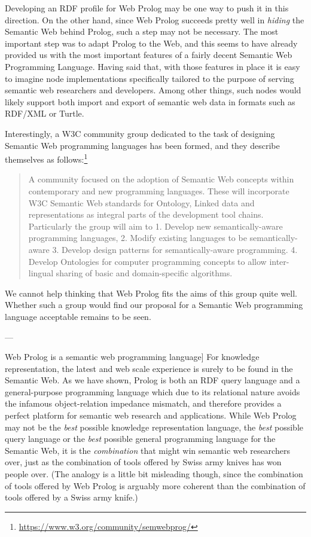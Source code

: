 \documentclass{tlp}
\begin{document}
Developing an RDF profile for Web Prolog may be one way to push it in this direction. On the other hand, since Web Prolog succeeds pretty well in \textit{hiding} the Semantic Web behind Prolog, such a step may not be necessary. The most important step was to adapt Prolog to the Web, and this seems to have already provided us with the most important features of a fairly decent Semantic Web Programming Language. Having said that, with those features in place it is easy to imagine node implementations specifically tailored to the purpose of serving semantic web researchers and developers. Among other things, such nodes would likely support both import and export of semantic web data in formats such as RDF/XML or Turtle.

Interestingly, a W3C community group dedicated to the task of designing Semantic Web programming languages has been formed, and they describe themselves as follows:\footnote{\url{https://www.w3.org/community/semwebprog/}}

\begin{quote}
A community focused on the adoption of Semantic Web concepts within contemporary and new programming languages. These will incorporate W3C Semantic Web standards for Ontology, Linked data and representations as integral parts of the development tool chains. Particularly the group will aim to 1. Develop new semantically-aware programming languages, 2. Modify existing languages to be semantically-aware 3. Develop design patterns for semantically-aware programming. 4. Develop Ontologies for computer programming concepts to allow inter-lingual sharing of basic and domain-specific algorithms.
\end{quote}

\noindent We cannot help thinking that Web Prolog fits the aims of this group quite well. Whether such a group would find our proposal for a Semantic Web programming language acceptable remains to be seen.

---

Web Prolog is a semantic web programming language] For knowledge representation, the latest and web scale experience is surely to be found in the Semantic Web. As we have shown, Prolog is both an RDF query language and a general-purpose programming language which due to its relational nature avoids the infamous object-relation impedance mismatch, and therefore provides a perfect platform for semantic web research and applications. While Web Prolog may not be the \textit{best} possible knowledge representation language, the \textit{best} possible query language or the \textit{best} possible general programming language for the Semantic Web, it is the \textit{combination} that might win semantic web researchers over, just as the combination of tools offered by Swiss army knives has won people over. (The analogy is a little bit misleading though, since the combination of tools offered by Web Prolog is arguably more coherent than the combination of tools offered by a Swiss army knife.)
\end{document}
